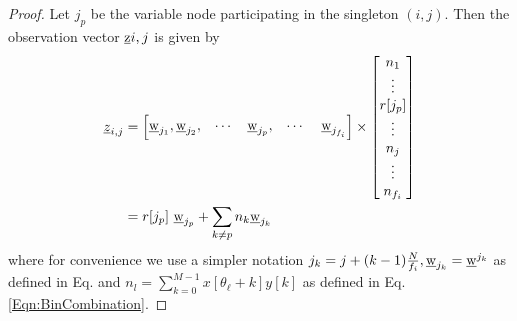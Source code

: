\begin{proof}
	
	Let $j_p$ be the variable node participating in the singleton $(i,j)$. Then the observation vector $\underline{\mathrm{z}}{i,j}$ is given by
	\begin{align*}
	\underline{z}_{i,j} &= \begin{bmatrix}
	\wv_{j_{1}},\wv_{j_2}, & \cdots   & \wv_{j_p}, &\cdots \ &\wv_{j_{f_i}}
	\end{bmatrix} \times
	\begin{bmatrix}
	n_{1} \\
	\vdots \\
	r[j_p]\\
	\vdots\\
	n_{j} \\
	\vdots\\
	n_{f_i}\\
	\end{bmatrix}\\
	&= r[j_p] ~ \wv_{j_p}+ \sum_{k \neq p}n_k \wv_{j_k} \\
	\end{align*}
	where for convenience we use a simpler notation $j_k=j+(k-1)\frac{N}{f_i}, \underline{\mathrm{w}}_{j_k}=\underline{\mathrm{w}}^{j_k}$ as defined in Eq. and $n_{l}=\sum\limits_{k=0}^{M-1}x[\theta_{\ell}+k]y[k]$ as defined in Eq. \eqref{Eqn:BinCombination}.
	

\end{proof}
